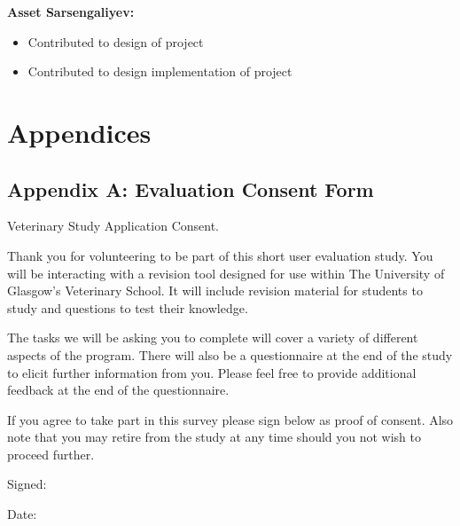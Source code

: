 \documentclass{l3proj}
\begin{document}
\textbf{Asset Sarsengaliyev:}
\begin{itemize}
\item Contributed to design of project
\item Contributed to design implementation of project
\end{itemize}

\newpage

\chapter{Appendices}

\section{Appendix A: Evaluation Consent Form}

Veterinary Study Application Consent.

Thank you for volunteering to be part of this short user evaluation study. You will be interacting with a revision tool designed for use within The University of Glasgow’s Veterinary School. It will include revision material for students to study and questions to test their knowledge. 

The tasks we will be asking you to complete will cover a variety of different aspects of the program. There will also be a questionnaire at the end of the study to elicit further information from you. Please feel free to provide additional feedback at the end of the questionnaire. 

If you agree to take part in this survey please sign below as proof of consent. Also note that you may retire from the study at any time should you not wish to proceed further.


Signed: 
					
Date:
\end{document}
